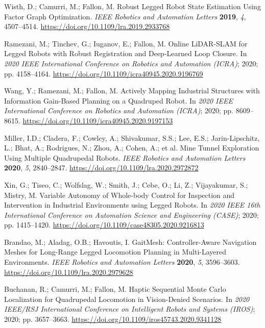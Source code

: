 Wisth, D.; Camurri, M.; Fallon, M. Robust Legged Robot State Estimation Using Factor Graph Optimization. \emph{IEEE Robotics and Automation Letters} \textbf{2019}, \emph{4}, 4507--4514. \url{https://doi.org/10.1109/lra.2019.2933768}

Ramezani, M.; Tinchev, G.; Iuganov, E.; Fallon, M. Online LiDAR-SLAM for Legged Robots with Robust Registration and Deep-Learned Loop Closure. In \emph{2020 IEEE International Conference on Robotics and Automation (ICRA)}; 2020; pp. 4158--4164. \url{https://doi.org/10.1109/icra40945.2020.9196769}

Wang, Y.; Ramezani, M.; Fallon, M. Actively Mapping Industrial Structures with Information Gain-Based Planning on a Quadruped Robot. In \emph{2020 IEEE International Conference on Robotics and Automation (ICRA)}; 2020; pp. 8609--8615. \url{https://doi.org/10.1109/icra40945.2020.9197153}

Miller, I.D.; Cladera, F.; Cowley, A.; Shivakumar, S.S.; Lee, E.S.; Jarin-Lipschitz, L.; Bhat, A.; Rodrigues, N.; Zhou, A.; Cohen, A.; et al. Mine Tunnel Exploration Using Multiple Quadrupedal Robots. \emph{IEEE Robotics and Automation Letters} \textbf{2020}, \emph{5}, 2840--2847. \url{https://doi.org/10.1109/lra.2020.2972872}

Xin, G.; Tiseo, C.; Wolfslag, W.; Smith, J.; Cebe, O.; Li, Z.; Vijayakumar, S.; Mistry, M. Variable Autonomy of Whole-body Control for Inspection and Intervention in Industrial Environments using Legged Robots. In \emph{2020 IEEE 16th International Conference on Automation Science and Engineering (CASE)}; 2020; pp. 1415--1420. \url{https://doi.org/10.1109/case48305.2020.9216813}

Brandao, M.; Aladag, O.B.; Havoutis, I. GaitMesh: Controller-Aware Navigation Meshes for Long-Range Legged Locomotion Planning in Multi-Layered Environments. \emph{IEEE Robotics and Automation Letters} \textbf{2020}, \emph{5}, 3596--3603. \url{https://doi.org/10.1109/lra.2020.2979628}

Buchanan, R.; Camurri, M.; Fallon, M. Haptic Sequential Monte Carlo Localization for Quadrupedal Locomotion in Vision-Denied Scenarios. In \emph{2020 IEEE/RSJ International Conference on Intelligent Robots and Systems (IROS)}; 2020; pp. 3657--3663. \url{https://doi.org/10.1109/iros45743.2020.9341128}


